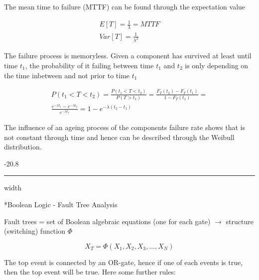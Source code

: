 \documentclass[8pt, landscape, fleqn]{scrartcl}
\makeatletter
\renewcommand{\subsubsection}{\@startsection{subsubsection}{1}{0mm}%
{-2\baselineskip}{0.8\baselineskip}%
{\hrule depth 0.2pt width\columnwidth\vspace*{1.2em}\normalsize\bfseries\rmfamily}}
\makeatother
\begin{document}
\begin{multicols*}{3}
 The mean time to failure (MTTF) can be found through the expectation value

 \begin{align}
     E[T] = \frac{1}{\lambda} = MTTF \\
     Var[T] = \frac{1}{\lambda^2}
 \end{align}

 The failure process is memoryless. Given a component has survived at least until time $t_1$, the probability of it failing between time $t_1$ and $t_2$ is only depending on the time inbetween and not prior to time $t_1$

 \begin{align}
     P(t_1 < T < t_2) = \frac{P(t_1 < T < t_2)}{P(T > t_1)} = \frac{F_T(t_2)-F_T(t_1)}{1-F_T(t_1)} = \\
     \frac{e^{-\lambda t_1}-e^{-\lambda t_2}}{e^{-\lambda t_1}} = 1-e^{-\lambda(t_2-t_1)}
 \end{align}

The influence of an ageing process of the components failure rate shows that is not constant through time and hence can be described through the Weibull distribution. 

\subsubsection*{Boolean Logic - Fault Tree Analysis}

Fault trees = set of Boolean algebraic equations (one for each gate) $\rightarrow$ structure (switching) function $\Phi$

\begin{equation}
    X_T = \Phi(X_1,X_2,X_3,...,X_N)
\end{equation}

The top event is connected by an OR-gate, hence if one of each events is true, then the top event will be true. Here some further rules:


\end{multicols*}
\end{document}

